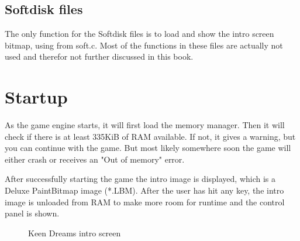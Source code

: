\documentclass[book.tex]{subfiles}
\begin{document}
\subsection{Softdisk files}
The only function for the Softdisk files is to load and show the intro screen bitmap, using  from soft.c. Most of the functions in these files are actually not used and therefor not further discussed in this book.
\pagebreak



\section{Startup}
As the game engine starts, it will first load the memory manager. Then it will check if there is at least 335KiB of RAM available. If not, it gives  a warning, but you can continue with the game. But most likely somewhere soon the game will either crash or receives an "Out of memory" error.\\
\par
After successfully starting the game the intro image is displayed, which is a Deluxe PaintBitmap image (*.LBM). After the user has hit any key, the intro image is unloaded from RAM to make more room for runtime and the control panel is shown.\\
\begin{figure}[H]
\centering
{}
\caption{Keen Dreams intro screen}
\end{figure}
\pagebreak
\end{document}
